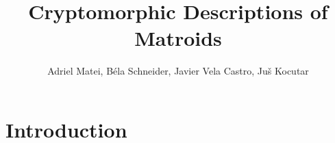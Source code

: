 \documentclass{article}
\title{Cryptomorphic Descriptions of Matroids}
\author{Adriel Matei, Béla Schneider, Javier Vela Castro, Juš Kocutar}
\theoremstyle{plain}
\theoremstyle{definition}
\theoremstyle{remark}
\numberwithin{equation}{section}
\begin{document}
\maketitle

\tableofcontents


\newpage
\section{Introduction}





















\nocite{*} 


\end{document}
